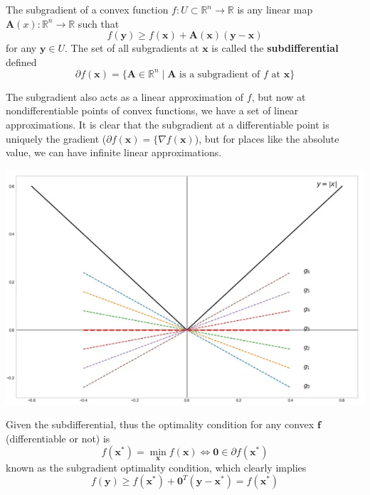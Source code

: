     \begin{definition}[Subgradient]
      The subgradient of a convex function $f: U \subset \mathbb{R}^n \rightarrow \mathbb{R}$ is any linear map $\mathbf{A} (x): \mathbb{R}^n \rightarrow \mathbb{R}$ such that 
      \begin{equation}
        f(\mathbf{y}) \geq f(\mathbf{x}) + \mathbf{A}(\mathbf{x}) (\mathbf{y} - \mathbf{x})
      \end{equation}
      for any $\mathbf{y} \in U$. The set of all subgradients at $\mathbf{x}$ is called the \textbf{subdifferential} defined 
      \begin{equation}
        \partial f (\mathbf{x}) = \{ \mathbf{A} \in \mathbb{R}^n \mid \mathbf{A} \text{ is a subgradient of } f \text{ at } \mathbf{x} \}
      \end{equation}
    \end{definition}

    The subgradient also acts as a linear approximation of $f$, but now at nondifferentiable points of convex functions, we have a set of linear approximations. It is clear that the subgradient at a differentiable point is uniquely the gradient ($\partial f(\mathbf{x}) = \{ \nabla f(\mathbf{x})$), but for places like the absolute value, we can have infinite linear approximations. 
    \begin{center}
      \includegraphics[scale=0.4]{img/subgradient_of_abs.png}
    \end{center}
    Given the subdifferential, thus the optimality condition for any convex $\mathbf{f}$ (differentiable or not) is
    \begin{equation}
      f(\mathbf{x}^\ast) = \min_{\mathbf{x}} f(\mathbf{x}) \iff \mathbf{0} \in \partial f(\mathbf{x}^\ast)
    \end{equation}
    known as the subgradient optimality condition, which clearly implies 
    \begin{equation}
      f(\mathbf{y}) \geq f(\mathbf{x}^\ast) + \mathbf{0}^T (\mathbf{y} - \mathbf{x}^\ast) = f(\mathbf{x}^\ast)
    \end{equation}

